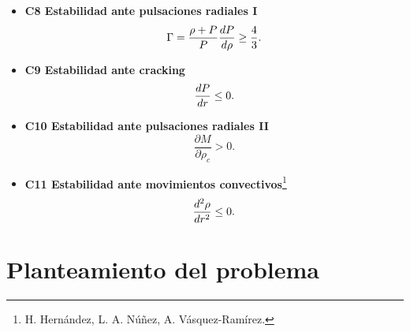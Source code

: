 \documentclass[11pt]{beamer}
\begin{document}
\begin{frame}{}
    \begin{itemize}
        \item \textbf{C8 Estabilidad ante pulsaciones radiales I} \\
            \begin{equation}
                \Gamma = \frac { \rho + P  } { P } \dv{P}{\rho} \geq \frac{4}{3}.
            \end{equation}
        \item \textbf{C9 Estabilidad ante cracking} \\
            \begin{equation}
                \dv{P}{r}\leq 0.
            \end{equation}
        \item \textbf{C10 Estabilidad ante pulsaciones radiales II} \\
            \begin{equation}
                \frac { \partial M } { \partial \rho _ { c } } > 0.
            \end{equation}
        \item \textbf{C11 Estabilidad ante movimientos convectivos}\footnote{H. Hernández, L. A. Núñez, A.
Vásquez-Ramírez.} \\
            \begin{equation}
                \dv[2]{\rho }{r} \leq 0.
            \end{equation}
    \end{itemize}
\end{frame}

\section{Planteamiento del problema}
\end{document}
